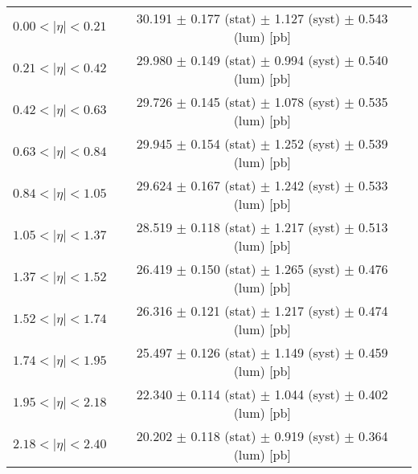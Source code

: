 \begin{tabular}{lc}
\hline
$0.00 < |\eta| <0.21$          & 30.191 $\pm$ 0.177 (stat) $\pm$ 1.127 (syst) $\pm$ 0.543 (lum) [pb]  \\
$0.21 < |\eta| <0.42$          & 29.980 $\pm$ 0.149 (stat) $\pm$ 0.994 (syst) $\pm$ 0.540 (lum) [pb]  \\
$0.42 < |\eta| <0.63$          & 29.726 $\pm$ 0.145 (stat) $\pm$ 1.078 (syst) $\pm$ 0.535 (lum) [pb]  \\
$0.63 < |\eta| <0.84$          & 29.945 $\pm$ 0.154 (stat) $\pm$ 1.252 (syst) $\pm$ 0.539 (lum) [pb]  \\
$0.84 < |\eta| <1.05$          & 29.624 $\pm$ 0.167 (stat) $\pm$ 1.242 (syst) $\pm$ 0.533 (lum) [pb]  \\
$1.05 < |\eta| <1.37$          & 28.519 $\pm$ 0.118 (stat) $\pm$ 1.217 (syst) $\pm$ 0.513 (lum) [pb]  \\
$1.37 < |\eta| <1.52$          & 26.419 $\pm$ 0.150 (stat) $\pm$ 1.265 (syst) $\pm$ 0.476 (lum) [pb]  \\
$1.52 < |\eta| <1.74$          & 26.316 $\pm$ 0.121 (stat) $\pm$ 1.217 (syst) $\pm$ 0.474 (lum) [pb]  \\
$1.74 < |\eta| <1.95$          & 25.497 $\pm$ 0.126 (stat) $\pm$ 1.149 (syst) $\pm$ 0.459 (lum) [pb]  \\
$1.95 < |\eta| <2.18$          & 22.340 $\pm$ 0.114 (stat) $\pm$ 1.044 (syst) $\pm$ 0.402 (lum) [pb]  \\
$2.18 < |\eta| <2.40$          & 20.202 $\pm$ 0.118 (stat) $\pm$ 0.919 (syst) $\pm$ 0.364 (lum) [pb]  \\
\hline
\end{tabular}
